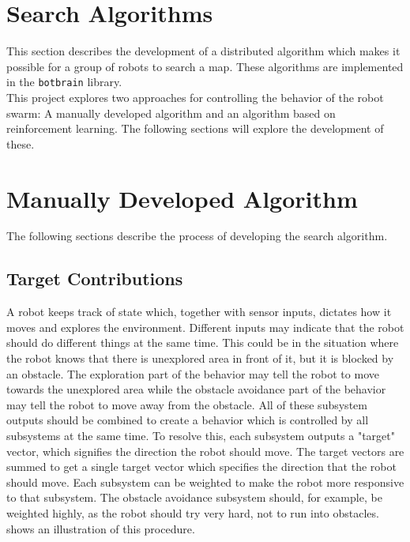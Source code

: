 
\section{Search Algorithms}
This section describes the development of a distributed algorithm which makes it possible for a group of robots to search a map. These algorithms are implemented in the \texttt{botbrain} library. \\

This project explores two approaches for controlling the behavior of the robot swarm: A manually developed algorithm {\color{red} and an algorithm based on reinforcement learning}. The following sections will explore the development of these.

\section{Manually Developed Algorithm}
The following sections describe the {\color{iterative}} process of developing the search algorithm.

\subsection{Target Contributions}
A robot keeps track of state which, together with sensor inputs, dictates how it moves and explores the environment. Different inputs may indicate that the robot should do different things at the same time. This could be in the situation where the robot {\color{red} knows} that there is unexplored area in front of it, but it is blocked by an obstacle. The exploration part of the behavior may tell the robot to move towards the unexplored area while the obstacle avoidance part of the behavior may {\color{red} tell} the robot to move away from the obstacle. All of these subsystem outputs should be combined to create a behavior which is controlled by all subsystems at the same time. To resolve this, each subsystem outputs a "target" vector, which signifies the direction the robot should move. The target vectors are summed to get a single target vector which specifies the direction that the robot should move. Each subsystem can be weighted to make the robot more responsive to that subsystem. The obstacle avoidance subsystem should, for example, be weighted highly, as the robot should {\color{red} try} very hard, not to run into obstacles.  shows an illustration of this procedure.

